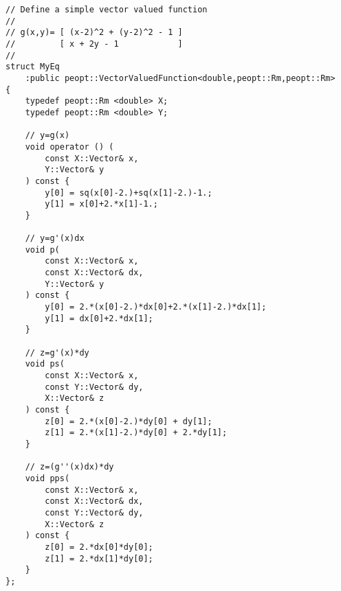 \begin{lstlisting}[style=C++]
// Define a simple vector valued function 
//
// g(x,y)= [ (x-2)^2 + (y-2)^2 - 1 ] 
//         [ x + 2y - 1            ] 
//
struct MyEq
    :public peopt::VectorValuedFunction<double,peopt::Rm,peopt::Rm>
{
    typedef peopt::Rm <double> X;
    typedef peopt::Rm <double> Y;

    // y=g(x) 
    void operator () (
        const X::Vector& x,
        Y::Vector& y
    ) const {
        y[0] = sq(x[0]-2.)+sq(x[1]-2.)-1.;
        y[1] = x[0]+2.*x[1]-1.;
    }

    // y=g'(x)dx
    void p(
        const X::Vector& x,
        const X::Vector& dx,
        Y::Vector& y
    ) const {
        y[0] = 2.*(x[0]-2.)*dx[0]+2.*(x[1]-2.)*dx[1];
        y[1] = dx[0]+2.*dx[1];
    }

    // z=g'(x)*dy
    void ps(
        const X::Vector& x,
        const Y::Vector& dy,
        X::Vector& z
    ) const {
        z[0] = 2.*(x[0]-2.)*dy[0] + dy[1];
        z[1] = 2.*(x[1]-2.)*dy[0] + 2.*dy[1];
    }

    // z=(g''(x)dx)*dy
    void pps(
        const X::Vector& x,
        const X::Vector& dx,
        const Y::Vector& dy,
        X::Vector& z
    ) const {
        z[0] = 2.*dx[0]*dy[0];
        z[1] = 2.*dx[1]*dy[0];
    }
};
\end{lstlisting}
